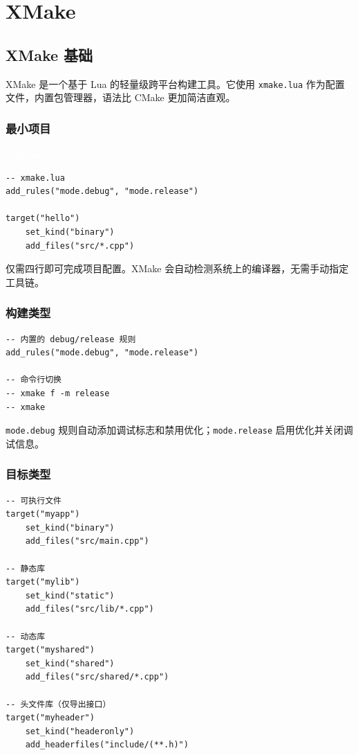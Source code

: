 \documentclass[12pt,a4paper,fontset=fandol]{ctexbook}
\newcommand{\Tp}[1]{\texttt{#1}}
\newcommand{\xmakelabel}{%
  \noindent\begin{tcolorbox}[sharp corners,colback=xmakeheadbg,colframe=xmakeheadbg,
    left=6pt,right=6pt,top=2pt,bottom=2pt,boxrule=0pt]
  \textcolor{white}{\small\bfseries\sffamily XMake}\end{tcolorbox}%
}
\begin{document}
\part{XMake}

\chapter{XMake 基础}

XMake 是一个基于 Lua 的轻量级跨平台构建工具。它使用 \Tp{xmake.lua} 作为配置文件，内置包管理器，语法比 CMake 更加简洁直观。

\section{最小项目}

\xmakelabel
\begin{lstlisting}[style=xmakestyle]
-- xmake.lua
add_rules("mode.debug", "mode.release")

target("hello")
    set_kind("binary")
    add_files("src/*.cpp")
\end{lstlisting}

\noindent
仅需四行即可完成项目配置。XMake 会自动检测系统上的编译器，无需手动指定工具链。

\section{构建类型}

\begin{lstlisting}[style=xmakestyle]
-- 内置的 debug/release 规则
add_rules("mode.debug", "mode.release")

-- 命令行切换
-- xmake f -m release
-- xmake
\end{lstlisting}

\noindent
\Tp{mode.debug} 规则自动添加调试标志和禁用优化；\Tp{mode.release} 启用优化并关闭调试信息。

\section{目标类型}

\begin{lstlisting}[style=xmakestyle]
-- 可执行文件
target("myapp")
    set_kind("binary")
    add_files("src/main.cpp")

-- 静态库
target("mylib")
    set_kind("static")
    add_files("src/lib/*.cpp")

-- 动态库
target("myshared")
    set_kind("shared")
    add_files("src/shared/*.cpp")

-- 头文件库（仅导出接口）
target("myheader")
    set_kind("headeronly")
    add_headerfiles("include/(**.h)")
\end{lstlisting}
\end{document}
